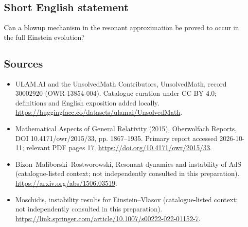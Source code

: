 \documentclass[11pt]{article}
\begin{document}
\subsection{Short English statement}
Can a blowup mechanism in the resonant approximation be proved to occur in the full Einstein evolution?
\subsection{Sources}
\begin{itemize}
\item[\hypertarget{source:30002920:1}{S1}] ULAM.AI and the UnsolvedMath Contributors, UnsolvedMath, record 30002920 (OWR-13854-004). Catalogue curation under CC BY 4.0; definitions and English exposition added locally.
\url{https://huggingface.co/datasets/ulamai/UnsolvedMath}.
\item[\hypertarget{source:30002920:2}{S2}] Mathematical Aspects of General Relativity (2015), Oberwolfach Reports, DOI 10.4171/owr/2015/33, pp. 1867--1935. Primary report accessed 2026-10-11; relevant PDF pages 17.
\url{https://doi.org/10.4171/owr/2015/33}.
\item[\hypertarget{source:30002920:3}{S3}] Bizon--Maliborski--Rostworowski, Resonant dynamics and instability of AdS (catalogue-listed context; not independently consulted in this preparation).
\url{https://arxiv.org/abs/1506.03519}.
\item[\hypertarget{source:30002920:4}{S4}] Moschidis, instability results for Einstein--Vlasov (catalogue-listed context; not independently consulted in this preparation).
\url{https://link.springer.com/article/10.1007/s00222-022-01152-7}.
\end{itemize}
\label{end:30002920}
\end{document}
